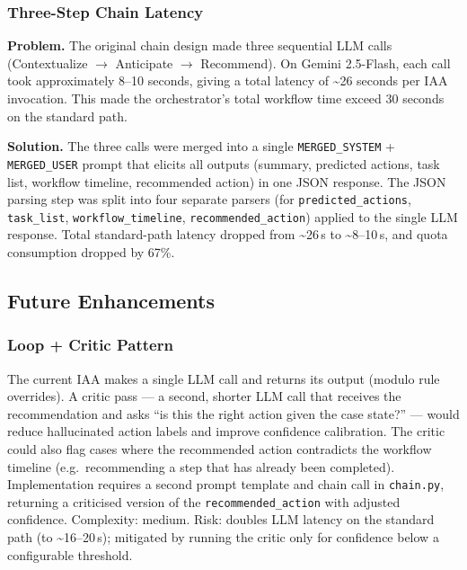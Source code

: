 \documentclass[12pt,a4paper]{article}
\begin{document}
\subsubsection{Three-Step Chain Latency}

\textbf{Problem.} The original chain design made three sequential LLM calls
(Contextualize $\to$ Anticipate $\to$ Recommend). On Gemini 2.5-Flash, each call
took approximately 8--10 seconds, giving a total latency of \textasciitilde{}26 seconds
per IAA invocation. This made the orchestrator's total workflow time exceed 30 seconds
on the standard path.

\textbf{Solution.} The three calls were merged into a single \texttt{MERGED\_SYSTEM} +
\texttt{MERGED\_USER} prompt that elicits all outputs (summary, predicted actions,
task list, workflow timeline, recommended action) in one JSON response. The JSON
parsing step was split into four separate parsers (for \texttt{predicted\_actions},
\texttt{task\_list}, \texttt{workflow\_timeline}, \texttt{recommended\_action}) applied
to the single LLM response. Total standard-path latency dropped from
\textasciitilde{}26\,s to \textasciitilde{}8--10\,s, and quota consumption dropped by 67\%.

\subsection{Future Enhancements}

\subsubsection{Loop + Critic Pattern}

The current IAA makes a single LLM call and returns its output (modulo rule overrides).
A critic pass --- a second, shorter LLM call that receives the recommendation and
asks ``is this the right action given the case state?'' --- would reduce hallucinated
action labels and improve confidence calibration. The critic could also flag
cases where the recommended action contradicts the workflow timeline (e.g.\ recommending
a step that has already been completed). Implementation requires a second prompt template
and chain call in \texttt{chain.py}, returning a criticised version of the
\texttt{recommended\_action} with adjusted confidence. Complexity: medium. Risk:
doubles LLM latency on the standard path (to \textasciitilde{}16--20\,s); mitigated
by running the critic only for confidence below a configurable threshold.
\end{document}
